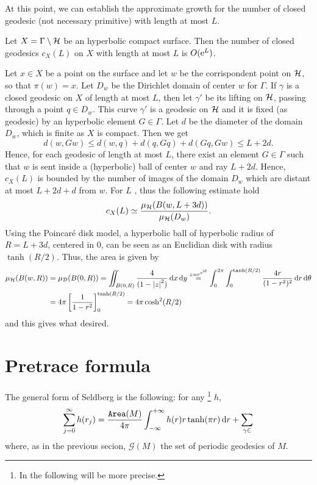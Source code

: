 At this point, we can establish the approximate growth for the number of closed geodesic (not necessary primitive) with length at most $L$.

\begin{nprop}
\label{prop:numb_geod_growth}
Let $X=\Gamma\setminus\mathcal{H}$ be an hyperbolic compact surface. Then the number of closed geodesics $c_{X}(L)$ on $X$ with length at most $L$ is $O(\mathrm{e}^{L})$.
\end{nprop}
\begin{prf}
Let $x\in X$ be a point on the surface and let $w$ be the corrispondent point on $\mathcal{H}$, so that $\pi(w)=x$. Let $D_{w}$ be the Dirichlet domain of center $w$ for $\Gamma$. If $\gamma$  is a closed geodesic on $X$ of length at most $L$, then let $\gamma'$ be its lifting on $\mathcal{H}$, passing through a point $q\in D_{w}$. This curve $\gamma'$ is a geodesic on $\mathcal{H}$ and it is fixed (as geodesic) by an hyperbolic element $G\in\Gamma$. Let $d$ be the diameter of the domain $D_{w}$, which is finite as $X$ is compact. Then we get
\[
d(w,Gw)\leq d(w,q)+d(q,Gq)+d(Gq,Gw)\leq L+2d.
\] 
Hence, for each geodesic of length at most $L$, there exist an element $G\in\Gamma$ such that $w$ is sent inside a (hyperbolic) ball of center $w$ and ray $L+2d$. Hence, $c_{X}(L)$ is bounded by the number of images of the domain $D_{w}$ which are distant at most $L+2d+d$ from $w$. For $L$ , thus the following estimate hold
\[
c_{X}(L)\simeq\frac{\mu_{\mathcal{H}}(B(w,L+3d))}{\mu_{\mathcal{H}}(D_{w})}.
\]
Using the Poincaré disk model, a hyperbolic ball of hyperbolic radius of $R=L+3d$, centered in $0$, can be seen as an Euclidian disk with radius $\tanh(R/2)$. Thus, the area is given by
\begin{align*}
\mu_{\mathcal{H}}(B(w,R))&=\mu_{\mathcal{D}}(B(0,R))=\iint_{B(0,R)}\frac{4}{(1-\left| z\right|^{2})}\mathop{}\!\mathrm{d} x\mathop{}\!\mathrm{d} y\stackrel{z=r^{e^{\mathrm{i}\theta}}}{=}\int_{0}^{2\pi}\int_{0}^{\tanh(R/2)}\frac{4r}{(1-r^{2})^{2}}\mathop{}\!\mathrm{d} r\mathop{}\!\mathrm{d} \theta\\
&=4\pi\left[\frac{1}{1-r^{2}}\right]_{0}^{\tanh(R/2)}=4\pi\cosh^{2}(R/2)
\end{align*}
and this gives what desired.
\end{prf}



\section{Pretrace formula}

The general form of Seldberg is the following: for any \footnote{In the following will be more precise.} $h$,
\[
\sum_{j=0}^{\infty}h(r_{j})=\frac{\operatorname{\mathtt{Area}}(M)}{4\pi}\int_{-\infty}^{+\infty}h(r) r \tanh(\pi r)\mathop{}\!\mathrm{d} r+\sum_{\gamma\in} 
\]
where, as in the previous secion, $\mathcal{G}(M)$ the set of periodic geodesics of $M$. 


